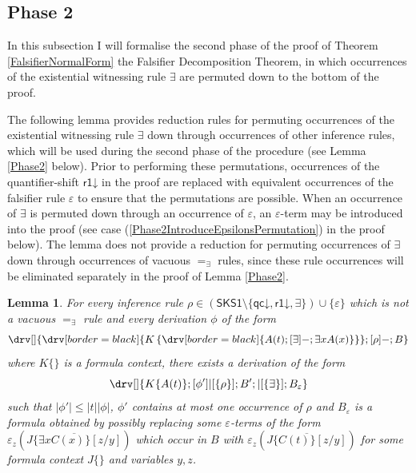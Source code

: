 \documentclass[10pt]{article}
\newtheorem{lemma}[theorem]{Lemma}
\theoremstyle{definition}\newtheorem{remark}[theorem]{Remark}
\theoremstyle{definition}\newtheorem{example}[theorem]{Example}
\theoremstyle{definition}\newtheorem{definition}[theorem]{Definition}
\newcommand{\SKSqDecomp}{{\mathsf{SKS1}}}
\newcommand{\qcDown}{{\mathsf{qc\mathord\downarrow}}}
\newcommand{\rOneDown}{{\mathsf{r1\mathord\downarrow}}}
\newcommand{\falsifierRule}{{\mathsf{\varepsilon}}}
\newcommand{\eqExists}{=_{\exists}}
\begin{document}
	\subsection{Phase 2}\label{Phase2Section}
	
	In this subsection I will formalise the second phase of the proof of Theorem \ref{FalsifierNormalForm} the Falsifier Decomposition Theorem, in which occurrences of the existential witnessing rule $\exists$ are permuted down to the bottom of the proof.
	
	The following lemma provides reduction rules for permuting occurrences of the existential witnessing rule $\exists$ down through occurrences of other inference rules, which will be used during the second phase of the procedure (see Lemma \ref{Phase2} below). Prior to performing these permutations, occurrences of the quantifier-shift $\rOneDown$ in the proof are replaced with equivalent occurrences of the falsifier rule $\falsifierRule$ to ensure that the permutations are possible. When an occurrence of $\exists$ is permuted down through an occurrence of $\falsifierRule$, an $\varepsilon$-term may be introduced into the proof (see case (\ref{Phase2IntroduceEpsilonsPermutation}) in the proof below). The lemma does not provide a reduction for permuting occurrences of $\exists$ down through occurrences of vacuous $\eqExists$ rules, since these rule occurrences will be eliminated separately in the proof of Lemma \ref{Phase2}.
	
	\begin{lemma}\label{Phase2Permutations}
		For every inference rule $\rho \in (\SKSqDecomp \setminus \{\qcDown, \rOneDown, \exists\}) \cup \{\falsifierRule\}$ which is not a vacuous $\eqExists$ rule and every derivation $\phi$ of the form
		\[
		\drv[] {
			\drv[border=black] {
				K \left\{ \drv[border=black] {
					A(t) ; [\exists]- ; \exists x A(x)
				} \right\}
			} ; [\rho]- ; B
		} 
		\]
		where $K \{\}$ is a formula context, there exists a derivation of the form
		\[
		\drv[] {
			K \{A(t)\} ; [\phi']|[\{\rho\}] ; B' ; |[\{\exists\}] ; B_\varepsilon
		}
		\]
		such that $| \phi' | \leq | t | | \phi |$, $\phi'$ contains at most one occurrence of $\rho$ and $B_\varepsilon$ is a formula obtained by possibly replacing some $\varepsilon$-terms of the form $\varepsilon_z (\overline{J \{ \exists x C(x) \} [z / y]})$ which occur in $B$ with $\varepsilon_z (\overline{J \{ C(t) \} [z / y]})$ for some formula context $J \{\}$ and variables $y, z$.
	\end{lemma}
	
\end{document}
